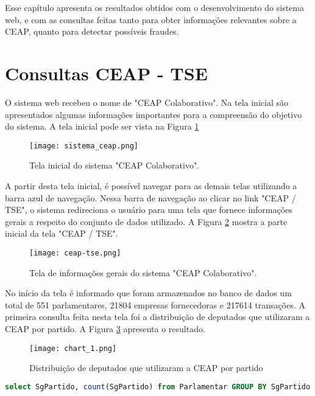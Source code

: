Esse capítulo apresenta os resultados obtidos com o desenvolvimento do sistema web, e com as consultas feitas tanto para obter informações relevantes sobre a CEAP, quanto para detectar possíveis fraudes.

\section{Consultas CEAP - TSE}

O sistema web recebeu o nome de "CEAP Colaborativo". Na tela inicial são apresentados algumas informações importantes para a compreensão do objetivo do sistema. A tela inicial pode ser vista na Figura \ref{fig:sistema_ceap}

\begin{figure}[H]
\centering
\texttt{[image: sistema\_ceap.png]}
\caption{Tela inicial do sistema "CEAP Colaborativo".}
\label{fig:sistema_ceap}
\end{figure}

A partir desta tela inicial, é possível navegar para as demais telas utilizando a barra azul de navegação. Nessa barra de navegação ao clicar no link "CEAP / TSE", o sistema redireciona o usuário para uma tela que fornece informações gerais a respeito do conjunto de dados utilizado. A Figura \ref{fig:sistema_ceap_tse} mostra a parte inicial da tela "CEAP / TSE".

\begin{figure}[H]
\centering
\texttt{[image: ceap-tse.png]}
\caption{Tela de informações gerais do sistema "CEAP Colaborativo".}
\label{fig:sistema_ceap_tse}
\end{figure}

No início da tela é informado que foram armazenados no banco de dados um total de 551 parlamentares, 21804 empresas fornecedoras e 217614 transações.
A primeira consulta feita nesta tela foi a distribuição de deputados que utilizaram a CEAP por partido. A Figura \ref{fig:chart_1} apresenta o resultado.

\begin{figure}[H]
\centering
\texttt{[image: chart\_1.png]}
\caption{Distribuição de deputados que utilizaram a CEAP por partido}
\label{fig:chart_1}
\end{figure}

\begin{lstlisting}[label={lst:consulta_chart_1}, caption={Consulta para a Figura \ref{fig:chart_1}},captionpos=b, language=sql]
select SgPartido, count(SgPartido) from Parlamentar GROUP BY SgPartido
\end{lstlisting}

